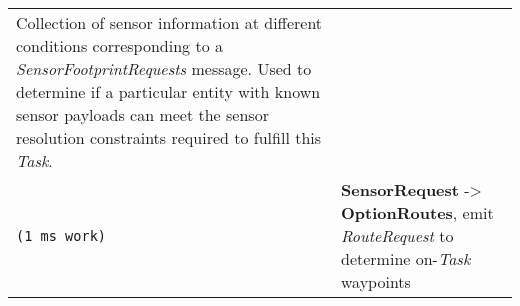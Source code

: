 \begin{longtable}[c]{@{}ll@{}}
\begin{minipage}[t]{0.65\columnwidth}
Collection of sensor information at different conditions corresponding
to a \emph{SensorFootprintRequests} message. Used to determine if a
particular entity with known sensor payloads can meet the sensor
resolution constraints required to fulfill this \emph{Task}.
\strut\end{minipage}\tabularnewline
\begin{minipage}[t]{0.29\columnwidth}\raggedright\strut
\begin{verbatim}
(1 ms work)
\end{verbatim}
\strut\end{minipage} &
\begin{minipage}[t]{0.65\columnwidth}\raggedright\strut
\textbf{SensorRequest} -\textgreater{} \textbf{OptionRoutes}, emit
\emph{RouteRequest} to determine on-\emph{Task} waypoints
\strut\end{minipage}\tabularnewline
\bottomrule
\end{longtable}

